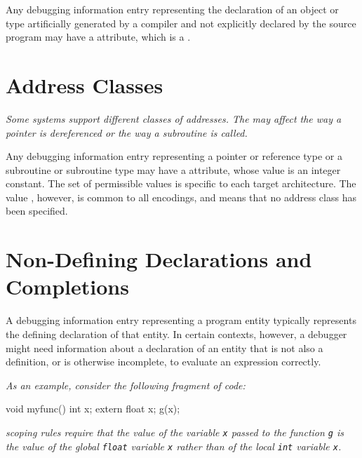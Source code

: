 Any debugging information entry representing the
declaration of an object or type artificially generated by
a compiler and not explicitly declared by the source
program\hypertarget{chap:DWATartificialobjectsortypesthat}{}
may have a
\DWATartificialDEFN{} attribute,
which is a .

\bb
\section{Address Classes}
\label{chap:addressclasses}
\eb
\textit{Some systems support different classes of addresses.
The  may affect the way a pointer
is dereferenced or the way a subroutine is called.}

Any debugging information entry representing a pointer or
reference type or a subroutine or subroutine type may
have a \DWATaddressclass{}
attribute, whose value is an integer
constant.  The set of permissible values is specific to
each target architecture. The value \DWADDRnoneTARG, however,
is common to all encodings, and means that no address class
has been specified.

\db

\section{Non-Defining Declarations and Completions}
\label{chap:nondefiningdeclarationsandcompletions}
A debugging information entry representing a program entity
typically represents the defining declaration of that
entity. In certain contexts, however, a debugger might need
information about a declaration of an entity that is not
also a definition, or is otherwise incomplete, to evaluate
an\hypertarget{chap:DWATdeclarationincompletenondefiningorseparateentitydeclaration}{}
expression correctly.

\textit{As an example, consider the following fragment of  code:}

\begin{nlnlisting}
void myfunc()
{
  int x;
  {
    extern float x;
    g(x);
  }
}
\end{nlnlisting}


\textit{ scoping rules require that the
value of the variable \texttt{x} passed to the function
\texttt{g} is the value of the global \texttt{float}
variable \texttt{x} rather than of the local \texttt{int}
variable \texttt{x}.}

